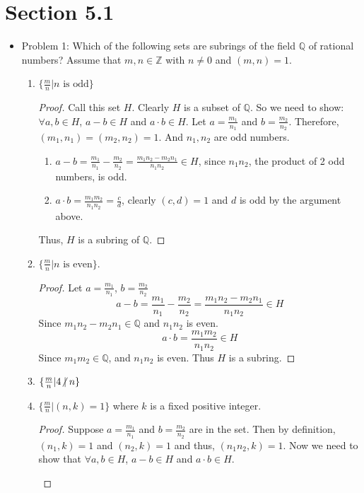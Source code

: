 \documentclass[hidelinks,12pt]{article}
\title{\scalebox{2}{Math 531 Homework 10}}
\author{\scalebox{1.5}{Theo Koss}}
\date{April 2021}
\newcommand{\Z}{\mathbb{Z}}
\newcommand{\Q}{\mathbb{Q}}
\begin{document}
\maketitle
\section{Section 5.1}
\begin{itemize}
    \item Problem 1: Which of the following sets are subrings of the field $\Q$ of rational numbers? Assume that $m,n\in\Z$ with $n\neq0$ and $(m,n)=1$.\begin{enumerate}[label=(\alph*)]
        \item $\{\frac{m}{n}|n\text{ is odd}\}$ \begin{proof}Call this set $H$. Clearly $H$ is a subset of $\Q$. So we need to show: $\forall a,b\in H$, $a-b\in H$ and $a\cdot b\in H$. Let $a=\frac{m_1}{n_1}$ and $b=\frac{m_2}{n_2}$. Therefore, $(m_1,n_1)=(m_2,n_2)=1$. And $n_1,n_2$ are odd numbers.\begin{enumerate}[label=\roman*]
            \item $a-b=\frac{m_1}{n_1}-\frac{m_2}{n_2}=\frac{m_1n_2-m_2n_1}{n_1n_2}\in H$, since $n_1n_2$, the product of 2 odd numbers, is odd.
            \item $a\cdot b=\frac{m_1m_2}{n_1n_2}=\frac{c}{d}$, clearly $(c,d)=1$ and $d$ is odd by the argument above.
        \end{enumerate}Thus, $H$ is a subring of $\Q$. \end{proof}
        \item $\{\frac{m}{n}|n\text{ is even}\}$.\begin{proof}Let $a=\frac{m_1}{n_1}$, $b=\frac{m_2}{n_2}$ $$a-b=\frac{m_1}{n_1}-\frac{m_2}{n_2}=\frac{m_1n_2-m_2n_1}{n_1n_2}\in H$$ Since $m_1n_2-m_2n_1\in\Q$ and $n_1n_2$ is even. $$a\cdot b=\frac{m_1m_2}{n_1n_2}\in H$$ Since $m_1m_2\in\Q$, and $n_1n_2$ is even. Thus $H$ is a subring.
        \end{proof}
        \item $\{\frac{m}{n}|4\centernot|n\}$
        \item $\{\frac{m}{n}|(n,k)=1\}$ where $k$ is a fixed positive integer.\begin{proof}
        Suppose $a=\frac{m_1}{n_1}$ and $b=\frac{m_2}{n_2}$ are in the set. Then by definition, $(n_1,k)=1$ and $(n_2,k)=1$ and thus, $(n_1n_2,k)=1$. Now we need to show that $\forall a,b\in H$, $a-b\in H$ and $a\cdot b\in H$.\begin{enumerate}[label=\roman*]

\end{enumerate}
\end{proof}
\end{enumerate}
\end{itemize}
\end{document}
